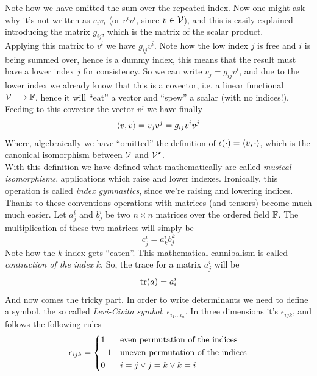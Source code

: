 \documentclass[../complete.tex]{subfiles}
\begin{document}
Note how we have omitted the sum over the repeated index. Now one might ask why it's not written as $v_iv_i$ (or $v^iv^i$, since $v\in\mathcal{V}$), and this is easily explained introducing the matrix $g_{ij}$, which is the matrix of the scalar product.\\
Applying this matrix to $v^i$ we have $g_{ij}v^i$. Note how the low index $j$ is free and $i$ is being summed over, hence is a dummy index, this means that the result must have a lower index $j$ for consistency. So we can write $v_j=g_{ij}v^i$, and due to the lower index we already know that this is a covector, i.e. a linear functional $\mathcal{V}\overset{}{\longrightarrow}\mathbb{F}$, hence it will ``eat'' a vector and ``spew'' a scalar (with no indices!). Feeding to this covector the vector $v^j$ we have finally
\begin{equation}
	\langle v, v \rangle=v_jv^j=g_{ij}v^iv^j
	\label{eq:dotproducteinsteinnot}
\end{equation}
Where, algebraically we have ``omitted'' the definition of $\iota(\cdot)=\langle v, \cdot \rangle$, which is the canonical isomorphism between $\mathcal{V}$ and $\mathcal{V}^\star$.\\
With this definition we have defined what mathematically are called \textit{musical isomorphisms}, applications which raise and lower indexes. Ironically, this operation is called \textit{index gymnastics}, since we're raising and lowering indices.
Thanks to these conventions operations with matrices (and tensors) become much much easier. Let $a^i_j$ and $b^i_j$ be two $n\times n$ matrices over the ordered field $\mathbb{F}$. The multiplication of these two matrices will simply be
\begin{equation}
	c^i_j=a^i_kb^k_j
	\label{eq:matrixprodein}
\end{equation}
Note how the $k$ index gets ``eaten''. This mathematical cannibalism is called \textit{contraction of the index} $k$. So, the trace for a matrix $a^i_j$ will be
\begin{equation}
	\trace(a)=a^i_i
	\label{eq:traceeinnot}
\end{equation}
And now comes the tricky part. In order to write determinants we need to define a symbol, the so called \textit{Levi-Civita symbol}, $\epsilon_{i_1\ldots i_n}$. In three dimensions it's $\epsilon_{ijk}$, and follows the following rules
\begin{equation}
	\epsilon_{ijk}=\begin{dcases}1&\text{even permutation of the indices}\\-1&\text{uneven permutation of the indices}\\0&i=j\vee j=k\vee k=i\end{dcases}
	\label{eq:3dlc}
\end{equation}
\end{document}
